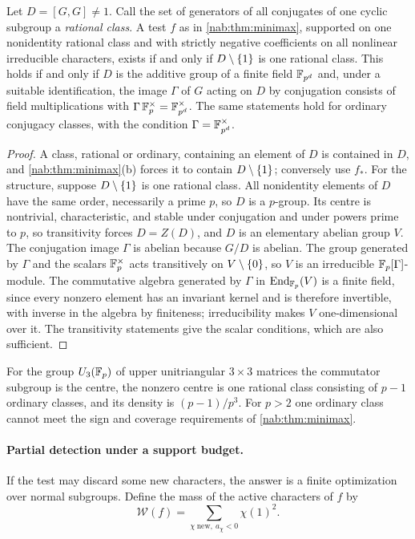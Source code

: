 \begin{proposition}\label{nab:prop:oneclass}
Let $D=[G,G]\ne1$. Call the set of generators of all conjugates of one cyclic subgroup a
\emph{rational class}. A test $f$ as in \cref{nab:thm:minimax}, supported on one
nonidentity rational class and with strictly negative coefficients on all nonlinear
irreducible characters, exists if and only if $D\setminus\{1\}$ is one rational class. This
holds if and only if $D$ is the additive group of a finite field $\mathbb{F}_{p^d}$ and, under a
suitable identification, the image $\Gamma$ of $G$ acting on $D$ by conjugation consists
of field multiplications with $\Gamma\,\mathbb{F}_p^\times=\mathbb{F}_{p^d}^\times$. The same statements
hold for ordinary conjugacy classes, with the condition $\Gamma=\mathbb{F}_{p^d}^\times$.
\end{proposition}
\begin{proof}
A class, rational or ordinary, containing an element of $D$ is contained in $D$, and
\cref{nab:thm:minimax}(b) forces it to contain $D\setminus\{1\}$; conversely use $f_*$.
For the structure, suppose $D\setminus\{1\}$ is one rational class. All nonidentity
elements of $D$ have the same order, necessarily a prime $p$, so $D$ is a $p$-group. Its
centre is nontrivial, characteristic, and stable under conjugation and under powers prime
to $p$, so transitivity forces $D=Z(D)$, and $D$ is an elementary abelian group $V$. The
conjugation image $\Gamma$ is abelian because $G/D$ is abelian. The group generated by
$\Gamma$ and the scalars $\mathbb{F}_p^\times$ acts transitively on $V\setminus\{0\}$, so $V$ is an
irreducible $\mathbb{F}_p[\Gamma]$-module. The commutative algebra generated by $\Gamma$ in
$\operatorname{End}_{\mathbb{F}_p}(V)$ is a finite
field, since every nonzero element has an invariant kernel and is therefore invertible,
with inverse in the algebra by finiteness; irreducibility makes $V$ one-dimensional over
it. The transitivity statements give the scalar conditions, which are also sufficient.
\end{proof}

For the group $U_3(\mathbb{F}_p)$ of upper unitriangular $3\times3$ matrices the commutator
subgroup is the centre, the nonzero centre is one rational class consisting of $p-1$
ordinary classes, and its density is $(p-1)/p^3$. For $p>2$ one ordinary class cannot meet
the sign and coverage requirements of \cref{nab:thm:minimax}.

\paragraph{Partial detection under a support budget.}
If the test may discard some new characters, the answer is a finite optimization over
normal subgroups. Define the mass of the active characters of $f$ by
\[
 \mathcal W(f)=\sum_{\chi\ \mathrm{new},\ a_\chi<0}\chi(1)^2 .
\]


